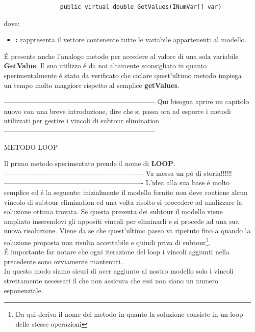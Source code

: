 \documentclass[11pt]{article}
\begin{document}
\begin{lstlisting}
                public virtual double GetValues(INumVar[] var)
\end{lstlisting}

dove:

\begin{itemize}
\item \textbf: rappresenta il vettore contenente tutte le variabile appartenenti al modello.
\end{itemize}

\'E presente anche l'analogo metodo per accedere al valore di una sola variabile \textbf{GetValue}. Il suo utilizzo \'e da noi altamente sconsigliato in quanto sperimentalmente \'e stato da verificato che ciclare quest'ultimo metodo impiega un tempo molto maggiore rispetto al semplice \textbf{getValues}.



------------------------------------------------------------------
Qui bisogna aprire un capitolo nuovo con una breve introduzione, dire che si passa ora ad esporre i metodi utilizzati per gestire i vincoli di subtour elimination
------------------------------------------------------------------


\vspace{2\baselineskip}
METODO LOOP
\vspace{2\baselineskip}

Il primo metodo sperimentato prende il nome di \textbf{LOOP}.
-------------------------------------------------------------
Va messa un p\'o di storia!!!!!!
-------------------------------------------------------------
L'idea alla sua base \'e molto semplice ed \'e la seguente: inizialmente il modello fornito non deve contiene alcun vincolo di subtour elimination ed una volta risolto si procedere ad analizzare la soluzione ottima trovata. Se questa presenta dei subtour il modello viene ampliato inserendovi gli appositi vincoli per eliminarli e si procede ad una sua nuova risoluzione. Viene da se che quest'ultimo passo va ripetuto fino a quando la soluzione proposta non risulta accettabile e quindi priva di subtour\footnote{Da qui deriva il nome del metodo in quanto la soluzione consiste in un loop delle stesse operazioni}.\\\'E importante far notare che ogni iterazione del loop i vincoli aggiunti nella precedente sono ovviamente mantenuti.\\
In questo modo siamo sicuri di aver aggiunto al nostro modello solo i vincoli strettamente necessari il che non assicura che essi non siano un numero esponenziale.\\
\end{document}

